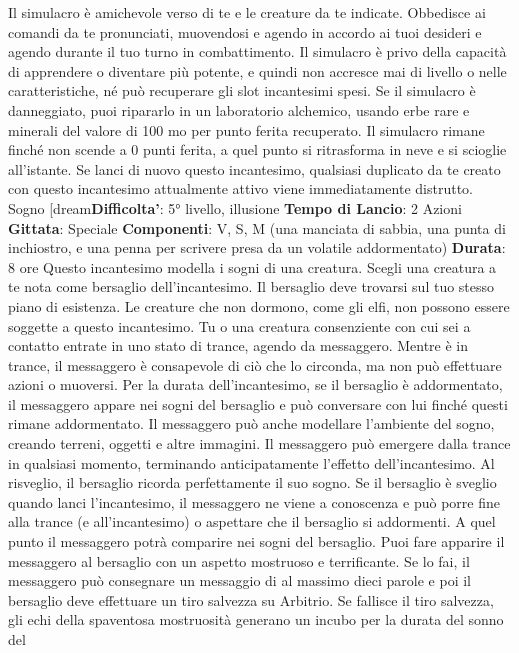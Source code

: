 \begin{multicols}{2}
Il simulacro è amichevole verso di te e le creature da te
indicate. Obbedisce ai comandi da te pronunciati,
muovendosi e agendo in accordo ai tuoi desideri e
agendo durante il tuo turno in combattimento. Il
simulacro è privo della capacità di apprendere o
diventare più potente, e quindi non accresce mai di
livello o nelle caratteristiche, né può recuperare gli slot
incantesimi spesi.
Se il simulacro è danneggiato, puoi ripararlo in un
laboratorio alchemico, usando erbe rare e minerali del
valore di 100 mo per punto ferita recuperato. Il
simulacro rimane finché non scende a 0 punti ferita, a
quel punto si ritrasforma in neve e si scioglie all’istante.
Se lanci di nuovo questo incantesimo, qualsiasi
duplicato da te creato con questo incantesimo
attualmente attivo viene immediatamente distrutto.
Sogno
[dream\textbf{Difficolta'}:
5° livello, illusione
\textbf{Tempo di Lancio}: 2 Azioni
\textbf{Gittata}: Speciale
\textbf{Componenti}: V, S, M (una manciata di sabbia, una
punta di inchiostro, e una penna per scrivere presa da
un volatile addormentato)
\textbf{Durata}: 8 ore
Questo incantesimo modella i sogni di una creatura.
Scegli una creatura a te nota come bersaglio
dell’incantesimo. Il bersaglio deve trovarsi sul tuo
stesso piano di esistenza. Le creature che non
dormono, come gli elfi, non possono essere soggette a
questo incantesimo. Tu o una creatura consenziente
con cui sei a contatto entrate in uno stato di trance,
agendo da messaggero. Mentre è in trance, il
messaggero è consapevole di ciò che lo circonda, ma
non può effettuare azioni o muoversi.
Per la durata dell’incantesimo, se il bersaglio è
addormentato, il messaggero appare nei sogni del
bersaglio e può conversare con lui finché questi rimane
addormentato. Il messaggero può anche modellare
l’ambiente del sogno, creando terreni, oggetti e altre
immagini. Il messaggero può emergere dalla trance in
qualsiasi momento, terminando anticipatamente l’effetto
dell’incantesimo. Al risveglio, il bersaglio ricorda
perfettamente il suo sogno. Se il bersaglio è sveglio
quando lanci l’incantesimo, il messaggero ne viene a
conoscenza e può porre fine alla trance (e
all’incantesimo) o aspettare che il bersaglio si
addormenti. A quel punto il messaggero potrà
comparire nei sogni del bersaglio.
Puoi fare apparire il messaggero al bersaglio con un
aspetto mostruoso e terrificante. Se lo fai, il
messaggero può consegnare un messaggio di al
massimo dieci parole e poi il bersaglio deve effettuare
un tiro salvezza su Arbitrio. Se fallisce il tiro
salvezza, gli echi della spaventosa mostruosità
generano un incubo per la durata del sonno del

\end{multicols}
